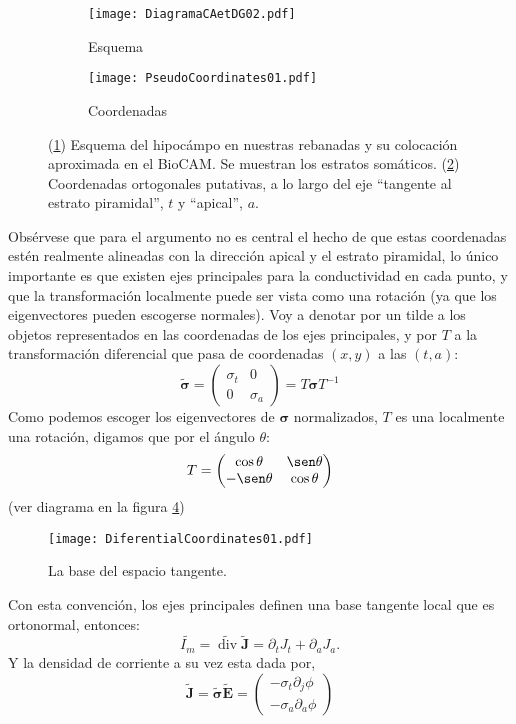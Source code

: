 \documentclass{article}
\newcommand{\Jd}{\mathbf{J}}
\newcommand{\EF}{\mathbf{E}}
\newcommand{\cond}{\boldsymbol{\sigma}}
\DeclareMathOperator{\diver}{div}
\begin{document}
\begin{figure}[h]
\centering
\begin{subfigure}[b]{0.45\textwidth}
\texttt{[image: DiagramaCAetDG02.pdf]}
\caption{Esquema}
\label{diagCA}
\end{subfigure}
\quad
\begin{subfigure}[b]{0.45\textwidth}
\texttt{[image: PseudoCoordinates01.pdf]}
\caption{Coordenadas}
\label{pseudocor}
\end{subfigure}
\caption{ (\ref{diagCA}) Esquema del hipocámpo en nuestras rebanadas y su
colocación aproximada en el BioCAM. Se muestran los estratos somáticos.
(\ref{pseudocor}) Coordenadas ortogonales putativas, a lo largo del eje
``tangente al estrato piramidal'', $t$ y ``apical'', $a$. } 
\label{esquemas01}
\end{figure}

Obsérvese que para el argumento no es central el hecho de que estas coordenadas
estén realmente alineadas con la dirección apical y el estrato piramidal, 
lo único importante es que existen ejes
principales para la conductividad en cada punto, y que la transformación
localmente puede ser vista como una rotación (ya que los eigenvectores pueden
escogerse normales). Voy  a denotar por un tilde a los objetos representados
en las coordenadas de los ejes principales, y por $T$ 
a la transformación diferencial que pasa de coordenadas $(x, y)$ a las $(t,a)$:
\begin{equation}
\tilde{\cond}=
\begin{pmatrix}
\sigma_{t} & 0 \\
0 & \sigma_{a}
\end{pmatrix} = T \cond T^{-1}
\end{equation}
Como podemos escoger los eigenvectores de $\cond$ normalizados, $T$ es 
una localmente una rotación, digamos que por el ángulo $\theta$:
\begin{equation}
T=
\begin{pmatrix}
\cos \theta  & \sen\theta \\
-\sen\theta  &\cos \theta 
\end{pmatrix}  
\end{equation}(ver diagrama en la figura \ref{diagdif})
\begin{figure}[h]
\centering
\texttt{[image: DiferentialCoordinates01.pdf]}
\caption{La base del espacio tangente.}\label{diagdif}
\end{figure}


Con esta convención, los ejes principales definen una base tangente local que
es ortonormal, entonces:
\begin{equation}\label{imcambio}
\tilde{I_m} = \widetilde{\diver} \tilde{\Jd}=\partial_t J_t+\partial_a J_a.
\end{equation}
Y la densidad de corriente a su vez esta dada por,
\begin{equation}
  \tilde{\Jd} = \tilde{\cond} \tilde{\EF}=\begin{pmatrix}
-\sigma_t \partial_j \phi \\
-\sigma_a \partial_a \phi 
\end{pmatrix}
\end{equation}
\end{document}
